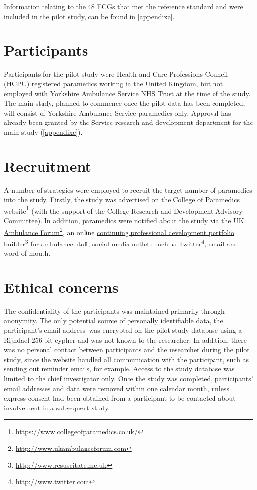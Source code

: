 Information relating to the 48 ECGs that met the reference standard and were included in the pilot study, can be found in \autoref{appendixa}. 

\section{Participants}
\label{participants}

Participants for the pilot study were Health and Care Professions Council (HCPC) registered paramedics working in the United Kingdom, but not employed with Yorkshire Ambulance Service NHS Trust at the time of the study. The main study, planned to commence once the pilot data has been completed, will consist of Yorkshire Ambulance Service paramedics only. Approval has already been granted by the Service research and development department for the main study (\autoref{appendixc}). 

\section{Recruitment}
\label{recruitment}

A number of strategies were employed to recruit the target number of paramedics into the study. Firstly, the study was advertised on the \href{https://www.collegeofparamedics.co.uk/}{College of Paramedics website}\footnote{\href{https://www.collegeofparamedics.co.uk/}{https:/\slash www.collegeofparamedics.co.uk\slash }} (with the support of the College Research and Development Advisory Committee). In addition, paramedics were notified about the study via the \href{http://www.ukambulanceforum.com}{UK Ambulance Forum}\footnote{\href{http://www.ukambulanceforum.com}{http:/\slash www.ukambulanceforum.com}}, an online \href{http://www.resuscitate.me.uk}{continuing professional development portfolio builder}\footnote{\href{http://www.resuscitate.me.uk}{http:/\slash www.resuscitate.me.uk}} for ambulance staff, social media outlets such as \href{http://www.twitter.com}{Twitter}\footnote{\href{http://www.twitter.com}{http:/\slash www.twitter.com}}, email and word of mouth. 

\section{Ethical concerns}
\label{ethicalconcerns}

The confidentiality of the participants was maintained primarily through anonymity. The only potential source of personally identifiable data, the participant's email address, was encrypted on the pilot study database using a Rijndael 256-bit cypher and was not known to the researcher. In addition, there was no personal contact between participants and the researcher during the pilot study, since the website handled all communication with the participant, such as sending out reminder emails, for example. Access to the study database was limited to the chief investigator only. Once the study was completed, participants' email addresses and data were removed within one calendar month, unless express consent had been obtained from a participant to be contacted about involvement in a subsequent study.

